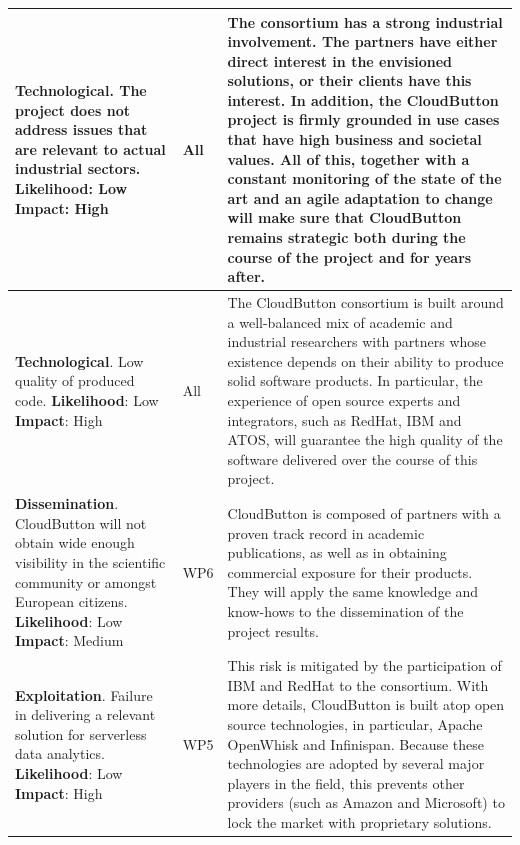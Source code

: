 \documentclass[a4paper,11pt]{article}
\newcommand{\proj}{CloudButton\xspace}
\begin{document}
{\begin{longtable} {| p{} | p{} | p{} | }
\textbf{Technological}. The project does not address issues that are relevant to actual industrial sectors.\newline
\textbf{Likelihood}: Low \newline
\textbf{Impact}: High
& All &
The consortium has a strong industrial involvement.
The partners have either direct interest in the envisioned solutions, or their clients have this interest.
In addition, the \proj project is firmly grounded in use cases that have high business and societal values.
All of this, together with a constant monitoring of the state of the art and an agile adaptation to change will make sure that \proj remains strategic both during the course of the project and for years after. \\ \hline
\textbf{Technological}. Low quality of produced code.\newline
\textbf{Likelihood}: Low \newline
\textbf{Impact}: High
& All &
The \proj consortium is built around a well-balanced mix of academic and industrial researchers with partners whose existence depends on their ability to produce solid software products.
In particular, the experience of open source experts and integrators, such as RedHat, IBM and ATOS, will guarantee the high quality of the software delivered over the course of this project.
\\ \hline


\textbf{Dissemination}. \proj will not obtain wide enough visibility in the scientific community or amongst European citizens.\newline
\textbf{Likelihood}: Low \newline
\textbf{Impact}: Medium
& WP6 &
\proj is composed of partners with a proven track record in academic publications, as well as in obtaining commercial exposure for their products.
They will apply the same knowledge and know-hows to the dissemination of the project results. \\ \hline


\textbf{Exploitation}. Failure in delivering a relevant solution for serverless data analytics. \newline
\textbf{Likelihood}: Low \newline
\textbf{Impact}: High
& WP5 &
This risk is mitigated by the participation of IBM and RedHat to the consortium.
With more details, \proj is built atop open source technologies, in particular, Apache OpenWhisk and Infinispan.
Because these technologies are adopted by several major players in the field, this prevents other providers (such as Amazon and Microsoft) to lock the market with proprietary solutions.
 \\ \hline


\end{longtable}}
\end{document}
